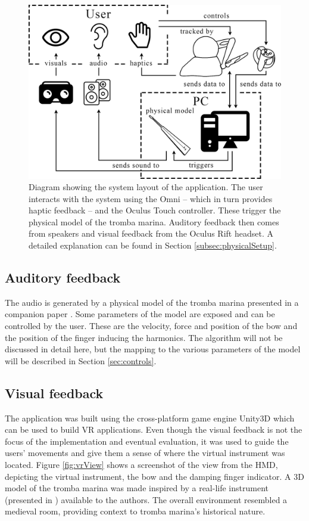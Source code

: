 \documentclass[dvipsnames, pdftex]{article}
\begin{document}
\begin{figure}[h]\includegraphics[width=1.0\columnwidth]{SMC 2020 paper template LaTeX/figures/blockdiagram.png}
\centering
  \caption{Diagram showing the system layout of the application. The user interacts with the system using the Omni -- which in turn provides haptic feedback -- and the Oculus Touch controller. These trigger the physical model of the tromba marina. Auditory feedback then comes from speakers and visual feedback from the Oculus Rift headset. A detailed explanation can be found in Section \ref{subsec:physicalSetup}. \label{fig:systemLayout}}
\end{figure}

\subsection{Auditory feedback}
The audio is generated by a physical model of the tromba marina presented in a companion paper \cite{Willemsen2020}. Some parameters of the model are exposed and can be controlled by the user. These are the velocity, force and position of the bow and the position of the finger inducing the harmonics. The algorithm will not be discussed in detail here, but the mapping to the various parameters of the model will be described in Section \ref{sec:controls}.

\subsection{Visual feedback}
The application was built using the cross-platform game engine Unity3D \cite{unity} which can be used to build VR applications. Even though the visual feedback is not the focus of the implementation and eventual evaluation, it was used to guide the users' movements and give them a sense of where the virtual instrument was located. Figure \ref{fig:vrView} shows a screenshot of the view from the HMD, depicting the virtual instrument, the bow and the damping finger indicator. A 3D model of the tromba marina was made inspired by a real-life instrument (presented in \cite{Baldwin2016}) available to the authors. The overall environment resembled a medieval room, providing context to tromba marina's historical nature.
\end{document}
